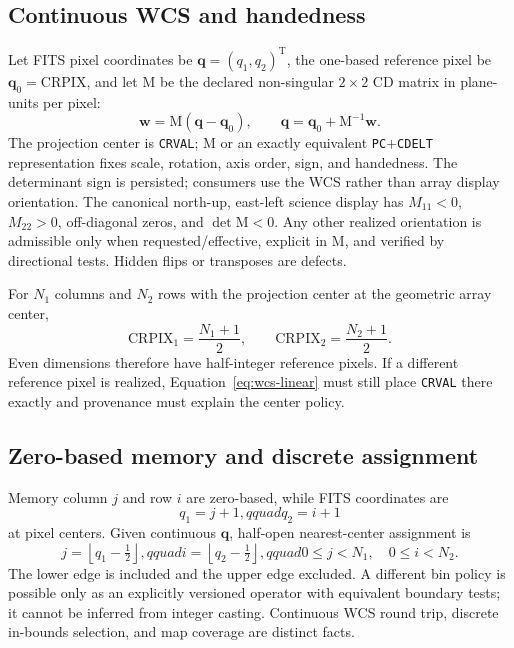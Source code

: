 \documentclass[11pt]{article}
\renewcommand{\mathsf}[1]{\mathrm{#1}}
\newcommand{\T}{\mathsf{T}}
\begin{document}
\subsection{Continuous WCS and handedness}

Let FITS pixel coordinates be $\boldsymbol q=(q_1,q_2)^\T$, the one-based
reference pixel be $\boldsymbol q_0=\mathrm{CRPIX}$, and let $\mathsf M$ be
the declared non-singular $2\times2$ CD matrix in plane-units per pixel:
\begin{equation}
 \boldsymbol w=\mathsf M(\boldsymbol q-\boldsymbol q_0),\qquad
 \boldsymbol q=\boldsymbol q_0+\mathsf M^{-1}\boldsymbol w.
 \label{eq:wcs-linear}
\end{equation}
The projection center is \texttt{CRVAL}; $\mathsf M$ or an exactly equivalent
\texttt{PC}$+$\texttt{CDELT} representation fixes scale, rotation, axis order,
sign, and handedness.  The determinant sign is persisted; consumers use the
WCS rather than array display orientation.  The canonical north-up,
east-left science display has $M_{11}<0$, $M_{22}>0$, off-diagonal zeros, and
$\det\mathsf M<0$.  Any other realized orientation is admissible only when
requested/effective, explicit in $\mathsf M$, and verified by directional
tests.  Hidden flips or transposes are defects.

For $N_1$ columns and $N_2$ rows with the projection center at the geometric
array center,
\begin{equation}
 \mathrm{CRPIX}_1=\frac{N_1+1}{2},\qquad
 \mathrm{CRPIX}_2=\frac{N_2+1}{2}.
 \label{eq:crpix}
\end{equation}
Even dimensions therefore have half-integer reference pixels.  If a different
reference pixel is realized, Equation~\eqref{eq:wcs-linear} must still place
\texttt{CRVAL} there exactly and provenance must explain the center policy.

\subsection{Zero-based memory and discrete assignment}

Memory column $j$ and row $i$ are zero-based, while FITS coordinates are
\begin{equation}
 q_1=j+1,qquad q_2=i+1
 \label{eq:index-base}
\end{equation}
at pixel centers.  Given continuous $\boldsymbol q$, half-open nearest-center
assignment is
\begin{equation}
 j=\left\lfloor q_1-\tfrac12\right\rfloor,qquad
 i=\left\lfloor q_2-\tfrac12\right\rfloor,qquad
 0\le j<N_1,\quad0\le i<N_2.
 \label{eq:pixel-assignment}
\end{equation}
The lower edge is included and the upper edge excluded.  A different bin
policy is possible only as an explicitly versioned operator with equivalent
boundary tests; it cannot be inferred from integer casting.  Continuous WCS
round trip, discrete in-bounds selection, and map coverage are distinct facts.
\end{document}
